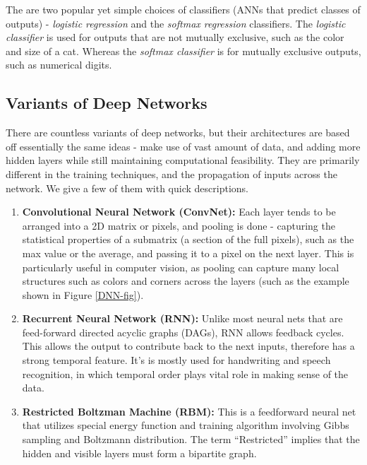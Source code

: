 \documentclass[12pt]{article}  %
\begin{document}
The are two popular yet simple choices of classifiers (ANNs that predict classes of outputs) - \emph{logistic regression} and the \emph{softmax regression} classifiers. The \emph{logistic classifier} is used for outputs that are not mutually exclusive, such as the color and size of a cat. Whereas the \emph{softmax classifier} is for mutually exclusive outputs, such as numerical digits.



\subsection{Variants of Deep Networks}

There are countless variants of deep networks, but their architectures are based off essentially the same ideas - make use of vast amount of data, and adding more hidden layers while still maintaining computational feasibility. They are primarily different in the training techniques, and the propagation of inputs across the network. We give a few of them with quick descriptions.

\begin{enumerate}
	\item {\bf Convolutional Neural Network (ConvNet):} Each layer tends to be arranged into a 2D matrix or pixels, and pooling is done - capturing the statistical properties of a submatrix (a section of the full pixels), such as the max value or the average, and passing it to a pixel on the next layer. This is particularly useful in computer vision, as pooling can capture many local structures such as colors and corners across the layers (such as the example shown in Figure \ref{DNN-fig}).
	\item {\bf Recurrent Neural Network (RNN):} Unlike most neural nets that are feed-forward directed acyclic graphs (DAGs), RNN allows feedback cycles. This allows the output to contribute back to the next inputs, therefore has a strong temporal feature. It's is mostly used for handwriting and speech recognition, in which temporal order plays vital role in making sense of the data.
	\item {\bf Restricted Boltzman Machine (RBM):} This is a feedforward neural net that utilizes special energy function and training algorithm involving Gibbs sampling and Boltzmann distribution. The term ``Restricted'' implies that the hidden and visible layers must form a bipartite graph.
\end{enumerate}
\end{document}
